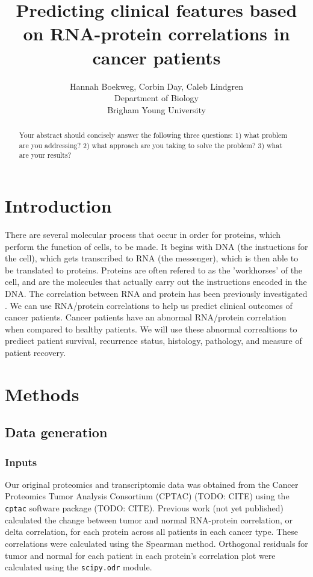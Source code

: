\documentclass{article}
\title{Predicting clinical features based on RNA-protein correlations in cancer patients}
\author{Hannah Boekweg, Corbin Day, Caleb Lindgren \\
Department of Biology\\
Brigham Young University}
\begin{document}
\maketitle

\begin{abstract}
  Your abstract should concisely answer the following three questions: 1) what problem are you addressing? 2) what approach are you taking to solve the problem? 3) what are your results?
\end{abstract}

\section{Introduction}
There are several molecular process that occur in order for proteins, which perform the function of cells, to be made. 
It begins with DNA (the instuctions for the cell), which gets transcribed to RNA (the messenger), which is then able to be translated to proteins. 
Proteins are often refered to as the 'workhorses' of the cell, and are the molecules that actually carry out the instructions encoded in the DNA.
The correlation between RNA and protein has been previously investigated \cite{waldbauer_transcriptome_2012} \cite{payne_utility_2015} \cite{han_transcriptome_2021}.
We can use RNA/protein correlations to help us predict clinical outcomes of cancer patients. Cancer patients have an abnormal RNA/protein correlation when compared to healthy patients. 
We will use these abnormal correaltions to prediect patient survival, recurrence status, histology, pathology, and measure of patient recovery. 

\section{Methods}

\subsection{Data generation}

\subsubsection{Inputs}

Our original proteomics and transcriptomic data was obtained from the Cancer Proteomics Tumor Analysis Consortium (CPTAC) (TODO: CITE) using the \texttt{cptac} software package (TODO: CITE). Previous work (not yet published) calculated the change between tumor and normal RNA-protein correlation, or delta correlation, for each protein across all patients in each cancer type. These correlations were calculated using the Spearman method. Orthogonal residuals for tumor and normal for each patient in each protein's correlation plot were calculated using the \texttt{scipy.odr} module.
\end{document}
